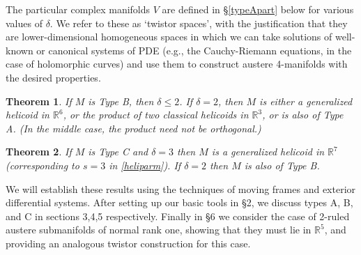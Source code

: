 \documentclass[12pt,reqno]{amsart}
\newtheorem{theorem}{Theorem}
\theoremstyle{definition}
\theoremstyle{remark}
\begin{document}
The particular complex manifolds $V$ are defined in \S\ref{typeApart}
below for various values of $\delta$.
We refer to these as `twistor spaces',
with the justification that they are lower-dimensional homogeneous spaces in which we can take
solutions of well-known or canonical systems of PDE (e.g., the Cauchy-Riemann equations,
in the case of holomorphic curves) and use them to construct austere 4-manifolds with
the desired properties.

\begin{theorem}  If $M$ is Type B, then $\delta \le 2$.  If $\delta=2$, then $M$ is either a generalized helicoid
in ${\mathbb R}^6$, or the product of two classical helicoids in ${\mathbb R}^3$, or is also of Type A.  (In the middle case,
 the product need not be orthogonal.)
\end{theorem}

\begin{theorem}\label{Ctheorem}  If $M$ is Type C and $\delta=3$ then $M$ is a generalized helicoid
in ${\mathbb R}^7$ (corresponding to $s=3$ in \eqref{heliparm}).
If $\delta=2$ then $M$ is also of Type B.
\end{theorem}

We will establish these results using the techniques of moving
frames and exterior differential systems.  After setting up our basic tools
in \S2, we discuss types A, B, and C in sections 3,4,5 respectively.
Finally in \S6 we consider the case of 2-ruled austere submanifolds of normal
rank one, showing that they must lie in ${\mathbb R}^5$, and providing an analogous
twistor construction for this case.
\end{document}
